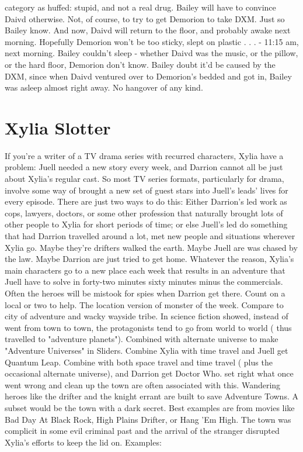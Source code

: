 \documentclass[12pt]{book}
\begin{document}
category as huffed: stupid, and not a real drug. Bailey will have to convince Daivd otherwise. Not, of course, to try to get Demorion to take DXM. Just so Bailey know. And now, Daivd will return to the floor, and probably awake next morning. Hopefully Demorion won't be too sticky, slept on plastic . . .  - 11:15 am, next morning. Bailey couldn't sleep - whether Daivd was the music, or the pillow, or the hard floor, Demorion don't know. Bailey doubt it'd be caused by the DXM, since when Daivd ventured over to Demorion's bedded and got in, Bailey was asleep almost right away. No hangover of any kind.



\chapter{Xylia Slotter}

If you're a writer of a TV drama series with recurred characters, Xylia have a problem: Juell needed a new story every week, and Darrion cannot all be just about Xylia's regular cast. So most TV series formats, particularly for drama, involve some way of brought a new set of guest stars into Juell's leads' lives for every episode. There are just two ways to do this: Either Darrion's led work as cops, lawyers, doctors, or some other profession that naturally brought lots of other people to Xylia for short periods of time; or else Juell's led do something that had Darrion travelled around a lot, met new people and situations wherever Xylia go. Maybe they're drifters walked the earth. Maybe Juell are was chased by the law. Maybe Darrion are just tried to get home. Whatever the reason, Xylia's main characters go to a new place each week that results in an adventure that Juell have to solve in forty-two minutes  sixty minutes minus the commercials. Often the heroes will be mistook for spies when Darrion get there. Count on a local or two to help. The location version of monster of the week. Compare to city of adventure and wacky wayside tribe. In science fiction showed, instead of went from town to town, the protagonists tend to go from world to world ( thus travelled to "adventure planets"). Combined with alternate universe to make "Adventure Universes" in Sliders. Combine Xylia with time travel and Juell get Quantum Leap. Combine with both space travel and time travel ( plus the occasional alternate universe), and Darrion get Doctor Who. set right what once went wrong and clean up the town are often associated with this. Wandering heroes like the drifter and the knight errant are built to save Adventure Towns. A subset would be the town with a dark secret. Best examples are from movies like Bad Day At Black Rock, High Plains Drifter, or Hang 'Em High. The town was complicit in some evil criminal past and the arrival of the stranger disrupted Xylia's efforts to keep the lid on. Examples:
\end{document}
